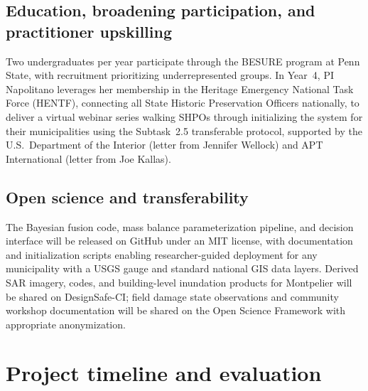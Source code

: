 \documentclass[11pt]{article}
\begin{document}
\vspace{-10pt}
\subsection{Education, broadening participation, and practitioner upskilling}

Two undergraduates per year participate through the BESURE program at Penn State,
with recruitment prioritizing underrepresented groups.
In Year~4, PI Napolitano leverages her membership in the Heritage Emergency
National Task Force (HENTF), connecting all State Historic Preservation Officers
nationally, to deliver a virtual webinar series walking SHPOs through initializing the
system for their municipalities using the Subtask~2.5 transferable protocol, supported by the U.S.\ Department of the Interior (letter from Jennifer Wellock) and APT International (letter from Joe Kallas).

\vspace{-10pt}
\subsection{Open science and transferability}
The Bayesian fusion code, mass balance parameterization pipeline, and decision
interface will be released on GitHub under an MIT license, with documentation and initialization scripts enabling researcher-guided deployment for any municipality with a USGS gauge and standard national GIS data layers.
Derived SAR imagery, codes, and building-level inundation products for Montpelier will be shared on
DesignSafe-CI; field damage state observations and community workshop documentation
will be shared on the Open Science Framework with appropriate anonymization.


\section{Project timeline and evaluation}
\end{document}
